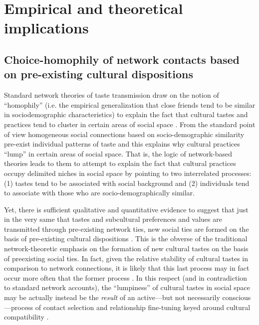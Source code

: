 \section{Empirical and theoretical implications}
\subsection{Choice-homophily of network contacts based on pre-existing cultural dispositions}
Standard network theories of taste transmission draw on the notion of ``homophily'' (i.e. the empirical generalization that close friends tend to be similar in sociodemographic characteristics) to explain the fact that cultural tastes and practices tend to cluster in certain areas of social space \citep{mark03}.  From the standard point of view homogeneous social connections based on socio-demographic similarity pre-exist individual patterns of taste and this explains why cultural practices ``lump'' in certain areas of social space.  That is, the logic of network-based theories leads to them to attempt to explain the fact that cultural practices occupy delimited niches in social space by pointing to two interrelated processes:  (1) tastes tend to be associated with social background and (2) individuals tend to associate with those who are socio-demographically similar.  

Yet, there is sufficient qualitative \citep{cardon_granjon05, long03, wali_etal02} and quantitative \citep{lizardo06a, vaisey_lizardo10, wimmer_lewis10} evidence to suggest that just in the very same that tastes and subcultural preferences and values are transmitted through pre-existing network ties, new social ties are formed on the basis of pre-existing cultural dispositions \citep{lazarsfeld_merton54}.  This is the obverse of the traditional network-theoretic emphasis on the formation of new cultural tastes on the basis of preexisting social ties.  In fact, given the relative stability of cultural tastes in comparison to network connections, it is likely that this last process may in fact occur more often that the former process \citet{lizardo06a}.  In this respect (and in contradiction to standard network accounts), the ``lumpiness'' of cultural tastes in social space may be actually instead be the \emph{result} of an active---but not necessarily conscious---process of contact selection and relationship fine-tuning keyed around cultural compatibility \citep{lazarsfeld_merton54, vaisey_lizardo10, dimaggio93b}.

